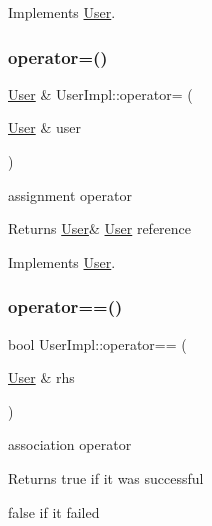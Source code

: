 Implements \hyperlink{classUser_ae326f0c51a673f749ed57b9f0d0b723a}{User}.

\mbox{\label{classUserImpl_aa89ed62b1dbd34811cf7e32137009b6d}} 
\subsubsection{\texorpdfstring{operator=()}{operator=()}}
{\footnotesize\ttfamily \hyperlink{classUser}{User} \& User\+Impl\+::operator= (\begin{DoxyParamCaption}\item[{\hyperlink{classUser}{User} \&}]{user }\end{DoxyParamCaption})\hspace{0.3cm}{\ttfamily [virtual]}}



assignment operator 

\begin{DoxyReturn}{Returns}
\hyperlink{classUser}{User}\& \hyperlink{classUser}{User} reference 
\end{DoxyReturn}


Implements \hyperlink{classUser_afd7134b455781d42362cf5fd0d5d2e68}{User}.

\mbox{\label{classUserImpl_a1b79e70d839345e3ea0b05637183c1e1}} 
\subsubsection{\texorpdfstring{operator==()}{operator==()}}
{\footnotesize\ttfamily bool User\+Impl\+::operator== (\begin{DoxyParamCaption}\item[{\hyperlink{classUser}{User} \&}]{rhs }\end{DoxyParamCaption})\hspace{0.3cm}{\ttfamily [virtual]}}



association operator 

\begin{DoxyReturn}{Returns}
true if it was successful 

false if it failed 
\end{DoxyReturn}


